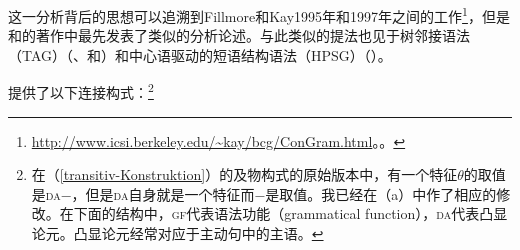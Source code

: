 这一分析背后的思想可以追溯到Fillmore和Kay1995年和1997年之间的工作\footnote{%
\url{http://www.icsi.berkeley.edu/~kay/bcg/ConGram.html}。。
}，但是和的著作中最先发表了类似的分析论述。与此类似的提法也见于树邻接语法\indextagc（TAG）（\citealp{Candito96a}、\citealp[]{CK2003a-u}和\citealp[--172]{KO2012a}）和中心语驱动的短语结构语法\indexhpsgc（HPSG）（\citealp{Koenig99a,DK2000b-u,Kordoni2001b-u}）。

\citet[--57]{MR2001a}提供了以下连接构式：\footnote{%
	在（\ref{transitiv-Konstruktion}）的及物构式的原始版本中，有一个特征$\theta$的取值是\textsc{da}$-$，但是\textsc{da}自身就是一个特征而$-$是取值。我已经在（a）中作了相应的修改。在下面的结构中，\textsc{gf}代表语法功能（grammatical function），\textsc{da}代表凸显论元。凸显论元经常对应于主动句中的主语。}
	
